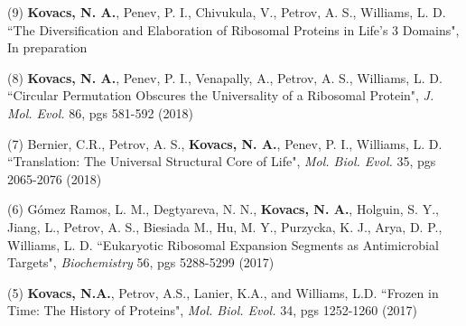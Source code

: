 

\begin{cvpublications}


\cvpublication
{(9) {\bf Kovacs, N. A.}, Penev, P. I., Chivukula, V., Petrov, A. S., Williams, L. D. ``The Diversification and Elaboration of Ribosomal Proteins in Life’s 3 Domains", In preparation}
\vspace{-4.0mm}


{(8) {\bf Kovacs, N. A.}, Penev, P. I., Venapally, A., Petrov, A. S., Williams, L. D. ``Circular Permutation Obscures the Universality of a Ribosomal Protein", {\it J. Mol. Evol.} 86, pgs 581-592 (2018)}


{(7) Bernier, C.R., Petrov, A. S., {\bf Kovacs, N. A.},  Penev, P. I., Williams, L. D. ``Translation: The Universal Structural Core of Life", {\it Mol. Biol. Evol.} 35, pgs 2065-2076 (2018)}


{(6) G{\'o}mez Ramos, L. M., Degtyareva, N. N., {\bf Kovacs, N. A.}, Holguin, S. Y., Jiang, L., Petrov, A. S., Biesiada M., Hu, M. Y., Purzycka, K. J., Arya, D. P., Williams, L. D. ``Eukaryotic Ribosomal Expansion Segments as Antimicrobial Targets", {\it Biochemistry} 56, pgs 5288-5299 (2017)}


\cvpublication
{(5) {\bf Kovacs, N.A.}, Petrov, A.S., Lanier, K.A., and Williams, L.D. ``Frozen in Time: The History of Proteins", {\it Mol. Biol. Evol.} 34, pgs 1252-1260 (2017)}
\vspace{-4.0mm}


\end{cvpublications}
